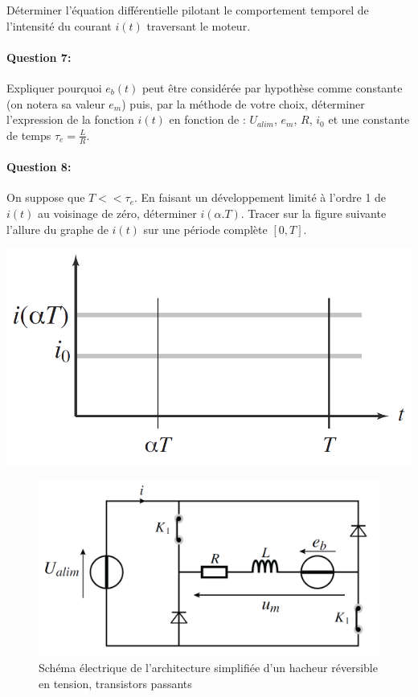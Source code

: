 Déterminer l'équation différentielle pilotant le comportement temporel de l'intensité du courant $i(t)$ traversant le moteur.

\paragraph{Question 7:}

Expliquer pourquoi $e_b(t)$ peut être considérée par hypothèse comme constante (on notera sa valeur $e_m$) puis, par la méthode de votre choix, déterminer l'expression de la fonction $i(t)$ en fonction de : $U_{alim}$, $e_m$, $R$, $i_0$ et une constante de temps $\tau_e=\frac{L}{R}$.

\paragraph{Question 8:}

On suppose que $T<<\tau_e$. En faisant un développement limité à l'ordre 1 de $i(t)$ au voisinage de zéro, déterminer $i(\alpha.T)$. Tracer sur la figure suivante l'allure du graphe de $i(t)$ sur une période complète $[0, T]$.

\begin{center}
 \includegraphics[width=0.8\linewidth]{img/td02_13}
\end{center}


\begin{figure}[!h]
 \centering \includegraphics[width=0.8\linewidth]{img/td02_09}
 \caption{Schéma électrique de l'architecture simplifiée d'un hacheur réversible en tension, transistors passants}
 \label{td02_09}
\end{figure}


